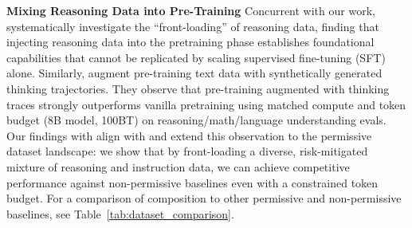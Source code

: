 \textbf{Mixing Reasoning Data into Pre-Training}
Concurrent with our work, \citet{akter2025front} systematically investigate the ``front-loading'' of reasoning data, finding that injecting reasoning data into the pretraining phase establishes foundational capabilities that cannot be replicated by scaling supervised fine-tuning (SFT) alone. Similarly, \cite{wang2025thinking} augment pre-training text data with synthetically generated thinking trajectories. They observe that pre-training augmented with thinking traces strongly outperforms vanilla pretraining using matched compute and token budget (8B model, 100BT) on reasoning/math/language understanding evals. Our findings with \MixtureVitae{} align with and extend this observation to the permissive dataset landscape: we show that by front-loading a diverse, risk-mitigated mixture of reasoning and instruction data, we can achieve competitive performance against non-permissive baselines even with a constrained token budget. For a comparison of \MixtureVitae{} composition to other permissive and non-permissive baselines, see Table~\ref{tab:dataset_comparison}. 



